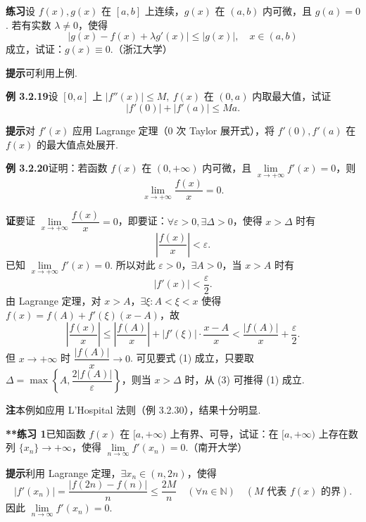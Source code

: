 \documentclass[UTF8,12pt,a4paper,fontset=fandol]{ctexart}
\begin{document}
\noindent\textbf{练习}\quad 设 $f(x),g(x)$ 在 $[a,b]$ 上连续，$g(x)$ 在 $(a,b)$ 内可微，且 $g(a)=0$. 若有实数 $\lambda\ne0$，使得
\[
  |g(x)-f(x)+\lambda g'(x)|\le |g(x)|,\quad x\in(a,b)
\tag{1}
\]
成立，试证：$g(x)\equiv0$.（浙江大学）

\noindent\textbf{提示}\quad 可利用上例.

\noindent\textbf{例 3.2.19}\quad 设 $[0,a]$ 上 $|f''(x)|\le M,\ f(x)$ 在 $(0,a)$ 内取最大值，试证
\[
  |f'(0)|+|f'(a)|\le Ma.
\]

\noindent\textbf{提示}\quad 对 $f'(x)$ 应用 Lagrange 定理（0 次 Taylor 展开式），将 $f'(0),f'(a)$ 在 $f(x)$ 的最大值点处展开.

\noindent\textbf{例 3.2.20}\quad 证明：若函数 $f(x)$ 在 $(0,+\infty)$ 内可微，且 $\lim\limits_{x\to+\infty}f'(x)=0$，则
\[
  \lim_{x\to+\infty}\frac{f(x)}x=0.
\]

\noindent\textbf{证}\quad 要证 $\lim\limits_{x\to+\infty}\dfrac{f(x)}x=0$，即要证：$\forall\varepsilon>0,\exists\Delta>0$，使得 $x>\Delta$ 时有
\begin{equation}
  \left|\frac{f(x)}x\right|<\varepsilon.
\tag{1}
\end{equation}
已知 $\lim\limits_{x\to+\infty}f'(x)=0$. 所以对此 $\varepsilon>0$，$\exists A>0$，当 $x>A$ 时有
\begin{equation}
  |f'(x)|<\frac{\varepsilon}{2}.
\tag{2}
\end{equation}
由 Lagrange 定理，对 $x>A$，$\exists\xi:A<\xi<x$ 使得 $f(x)=f(A)+f'(\xi)(x-A)$，故
\begin{equation}
  \left|\frac{f(x)}x\right|\le\left|\frac{f(A)}x\right|+|f'(\xi)|\cdot\frac{x-A}{x}
  <\frac{|f(A)|}{x}+\frac{\varepsilon}{2}.
\tag{3}
\end{equation}
但 $x\to+\infty$ 时 $\dfrac{|f(A)|}{x}\to0$. 可见要式 (1) 成立，只要取 $\Delta=\max\left\{A,\dfrac{2|f(A)|}{\varepsilon}\right\}$，则当 $x>\Delta$ 时，从 (3) 可推得 (1) 成立.

\noindent\textbf{注}\quad 本例如应用 L'Hospital 法则（例 3.2.30），结果十分明显.

\noindent\textbf{**练习 1}\quad 已知函数 $f(x)$ 在 $[a,+\infty)$ 上有界、可导，试证：在 $[a,+\infty)$ 上存在数列 $\{x_n\}\to+\infty$，使得 $\lim\limits_{n\to\infty}f'(x_n)=0$.（南开大学）

\noindent\textbf{提示}\quad 利用 Lagrange 定理，$\exists x_n\in(n,2n)$，使得
\[
  |f'(x_n)|=\frac{|f(2n)-f(n)|}{n}\le\frac{2M}{n}\quad(\forall n\in\mathbb N)\quad(M\text{ 代表 }f(x)\text{ 的界}).
\]
因此 $\lim\limits_{n\to\infty}f'(x_n)=0$.
\end{document}
